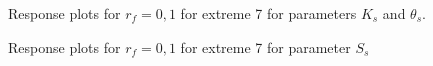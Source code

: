 \documentclass[review,times,3p,twocolumn,10pt]{elsarticle}
\begin{document}
\begin{figure}[htb!]
\label{ext6rf0-Kt2}
\caption{Response plots for $r_f=0,1$ for extreme 7 for parameters $K_s$ and $\theta_s$. }
\end{figure}

\begin{figure}[htb!]
\label{ext6rf0-Ss2}
\caption{Response plots for $r_f=0,1$ for extreme 7 for parameter $S_s$}
\end{figure}
\end{document}
